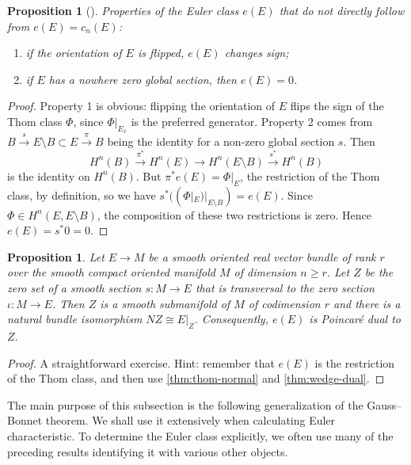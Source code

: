 \documentclass{report}
\theoremstyle{plain}
\newtheorem{proposition}[theorem]{Proposition}
\theoremstyle{definition}
\theoremstyle{remark}
\begin{document}
\begin{proposition}[{\cite[Property 9.3, Property 9.7]{Milnor1974}}]
  Properties of the Euler class $e(E)$ that do not directly follow
  from $e(E) = c_n(E)$:
  \begin{enumerate}
  \item if the orientation of $E$ is flipped, $e(E)$ changes sign;
  \item if $E$ has a nowhere zero global section, then $e(E) = 0$.
  \end{enumerate}
\end{proposition}

\begin{proof}
  Property 1 is obvious: flipping the orientation of $E$ flips the
  sign of the Thom class $\Phi$, since $\Phi|_{E_x}$ is the preferred
  generator. Property 2 comes from $B \xrightarrow{s} E \setminus B
  \subset E \xrightarrow{\pi} B$ being the identity for a non-zero
  global section $s$. Then
  \[ H^n(B) \xrightarrow{\pi^*} H^n(E) \to H^n(E \setminus B) \xrightarrow{s^*} H^n(B) \]
  is the identity on $H^n(B)$. But $\pi^*e(E) = \Phi|_E$, the
  restriction of the Thom class, by definition, so we have
  $s^*((\Phi|_E)|_{E \setminus B}) = e(E)$. Since $\Phi \in H^n(E, E
  \setminus B)$, the composition of these two restrictions is zero.
  Hence $e(E) = s^*0 = 0$.
\end{proof}

\begin{proposition} \label{thm:euler-dual}
  Let $E \to M$ be a smooth oriented real vector bundle of rank $r$
  over the smooth compact oriented manifold $M$ of dimension $n \ge
  r$. Let $Z$ be the zero set of a smooth section $s\colon M \to E$
  that is transversal to the zero section $\iota\colon M \to E$. Then
  $Z$ is a smooth submanifold of $M$ of codimension $r$ and there is a
  natural bundle isomorphism $NZ \cong E|_Z$. Consequently, $e(E)$
  is Poincar\'e dual to $Z$.
\end{proposition}

\begin{proof}
  A straightforward exercise. Hint: remember that $e(E)$ is the
  restriction of the Thom class, and then use \ref{thm:thom-normal}
  and \ref{thm:wedge-dual}.
\end{proof}

The main purpose of this subsection is the following generalization of
the Gauss--Bonnet theorem. We shall use it extensively when
calculating Euler characteristic. To determine the Euler class
explicitly, we often use many of the preceding results identifying it
with various other objects.
\end{document}
